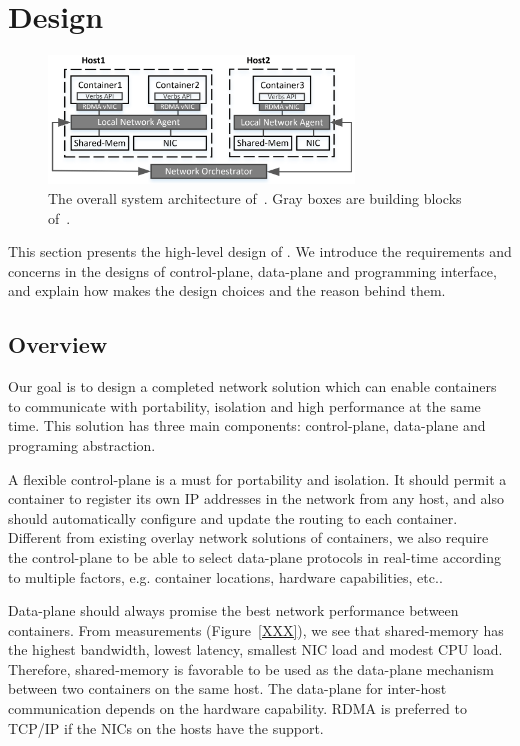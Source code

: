 \section{Design} \label{sec:design}

\begin{figure}[t!] 
     \centering 
     \includegraphics[width=3.2in]{figures/system-arch.png} 
    \caption{\label{fig:sysarch} The overall system architecture of~\sysname. Gray boxes are building blocks of~\sysname.} 
\end{figure} 

This section presents the high-level design of \sysname. We introduce
the requirements and concerns in the designs of control-plane, data-plane
and programming interface, and explain how \sysname makes the design choices
and the reason behind them.

\subsection{Overview}

Our goal is to design a completed network solution which can enable containers
to communicate with portability, isolation and high performance at the same time.
This solution has three main components: control-plane, data-plane and programing
abstraction. 

A flexible control-plane is a must for portability and isolation. 
It should permit a container to register its own IP addresses in the network
from any host, and also should automatically configure and update the routing 
to each container. Different from existing overlay network solutions of 
containers, we also require the control-plane to be able to select 
data-plane protocols in real-time according to multiple factors, 
e.g. container locations, hardware capabilities, etc..

Data-plane should always promise the best network performance between 
containers. From measurements (Figure~\ref{XXX}), 
we see that shared-memory has the highest
bandwidth, lowest latency, smallest NIC load and modest CPU load. 
Therefore, shared-memory is favorable to be used as the data-plane 
mechanism between two containers on the same host. 
The data-plane for inter-host communication
depends on the hardware capability. RDMA is preferred to TCP/IP if the NICs
on the hosts have the support.

